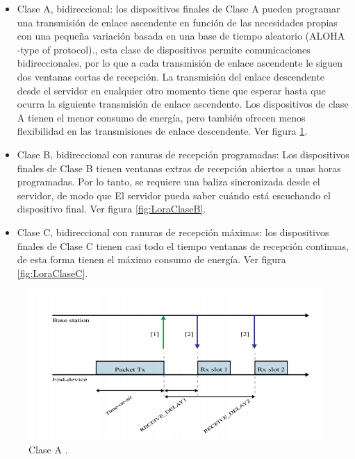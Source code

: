 \begin{itemize}
    \item Clase A, bidireccional: los dispositivos finales de Clase A pueden programar una transmisión de enlace ascendente en función de las necesidades propias con una pequeña variación basada en una base de tiempo aleatorio (ALOHA -type of protocol)., esta clase de dispositivos permite comunicaciones bidireccionales, por lo que a cada transmisión de enlace ascendente le siguen dos ventanas cortas de recepción. La transmisión del enlace descendente desde el servidor en cualquier otro momento tiene que esperar hasta que ocurra la siguiente transmisión de enlace ascendente. Los dispositivos de clase A tienen el menor consumo de energía, pero también ofrecen menos flexibilidad en las transmisiones de enlace descendente. Ver figura \ref{fig:LoraclassA}.

    \item Clase B, bidireccional con ranuras de recepción programadas: Los dispositivos finales de Clase B  tienen ventanas extras de recepción  abiertos a unas horas programadas. Por lo tanto, se requiere una baliza sincronizada desde el servidor, de modo que
    El servidor pueda saber cuándo está escuchando el dispositivo final. Ver figura \ref{fig:LoraClaseB}.
    
    \item Clase C, bidireccional con ranuras de recepción máximas: los dispositivos finales de Clase C tienen casi todo el tiempo ventanas de recepción continuas, de esta forma tienen el máximo consumo de energía. Ver figura \ref{fig:LoraClaseC}.
\end{itemize}


\begin{figure}[h]
	\centering
	\includegraphics[scale=.65]{./Figures/LoraclassA.PNG}
	\caption{Clase A \protect\footnotemark.}
	\label{fig:LoraclassA}
\end{figure}

